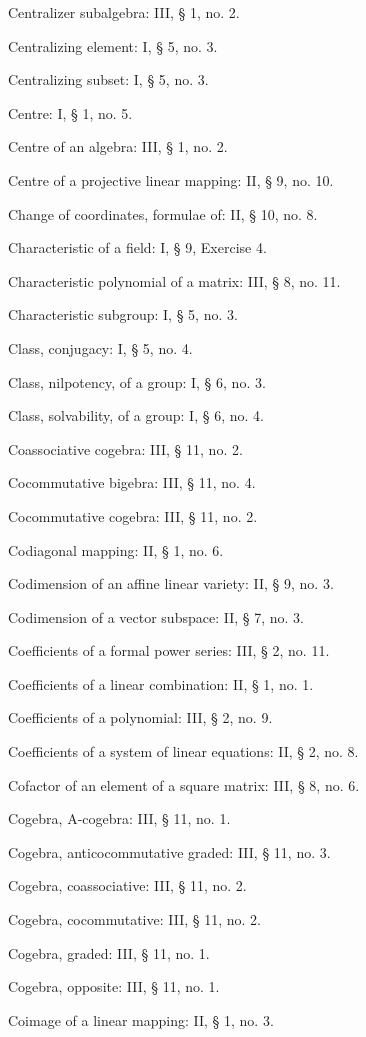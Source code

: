 Centralizer subalgebra: III, § 1, no. 2.

Centralizing element: I, § 5, no. 3.

Centralizing subset: I, § 5, no. 3.

Centre: I, § 1, no. 5.

Centre of an algebra: III, § 1, no. 2.

Centre of a projective linear mapping: II, § 9, no. 10.

Change of coordinates, formulae of: II, § 10, no. 8.

Characteristic of a field: I, § 9, Exercise 4.

Characteristic polynomial of a matrix: III, § 8, no. 11.

Characteristic subgroup: I, § 5, no. 3.

Class, conjugacy: I, § 5, no. 4.

Class, nilpotency, of a group: I, § 6, no. 3.

Class, solvability, of a group: I, § 6, no. 4.

Coassociative cogebra: III, § 11, no. 2.

Cocommutative bigebra: III, § 11, no. 4.

Cocommutative cogebra: III, § 11, no. 2.

Codiagonal mapping: II, § 1, no. 6.

Codimension of an affine linear variety: II, § 9, no. 3.

Codimension of a vector subspace: II, § 7, no. 3.

Coefficients of a formal power series: III, § 2, no. 11.

Coefficients of a linear combination: II, § 1, no. 1.

Coefficients of a polynomial: III, § 2, no. 9.

Coefficients of a system of linear equations: II, § 2, no. 8.

Cofactor of an element of a square matrix: III, § 8, no. 6.

Cogebra, A-cogebra: III, § 11, no. 1.

Cogebra, anticocommutative graded: III, § 11, no. 3.

Cogebra, coassociative: III, § 11, no. 2.

Cogebra, cocommutative: III, § 11, no. 2.

Cogebra, graded: III, § 11, no. 1.

Cogebra, opposite: III, § 11, no. 1.

Coimage of a linear mapping: II, § 1, no. 3.

